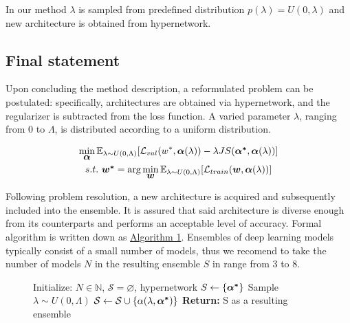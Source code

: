 \documentclass{article}
\begin{document}
In our method $\lambda$ is sampled from predefined distribution $p(\lambda) = U(0, \lambda)$ and new architecture is obtained from hypernetwork.

\subsection{Final statement}

Upon concluding the method description, a reformulated problem can be postulated: specifically, architectures are obtained via hypernetwork, and the regularizer is subtracted from the loss function. A varied parameter $\lambda$, ranging from 0 to $\Lambda$, is distributed according to a uniform distribution.

\begin{gather*}
        \min_{\mbox{\boldmath{$\alpha$}}} \mathbb{E}_{\lambda \sim U(0, \Lambda)} [\mathcal{L}_{val}(w^*, \mbox{\boldmath{$\alpha$}}(\lambda)) - \lambda JS(\mbox{\boldmath{$\alpha^*$}}, \mbox{\boldmath{$\alpha$}}(\lambda))] \\
    s.t. \text{ } \mbox{\boldmath{$w^*$}} = \arg \min_{\mbox{\boldmath{$w$}}} \mathbb{E}_{\lambda \sim U(0, \Lambda)}[\mathcal{L}_{train}(\mbox{\boldmath{$w$}}, \mbox{\boldmath{$\alpha$}}(\lambda))]
\end{gather*}

Following problem resolution, a new architecture is acquired and subsequently included into the ensemble. It is assured that said architecture is diverse enough from its counterparts and performs an acceptable level of accuracy. Formal algorithm is written down as \hyperref[alg:1]{Algorithm 1}. Ensembles of deep learning models typically consist of a small number of models, thus we recomend to take the number of models $N$ in the resulting ensemble $S$ in range from 3 to 8.
\begin{figure}[h]  
  \begin{minipage}{.6\linewidth}
    \begin{algorithm}[H]
    \caption{}\label{alg:1}
        \begin{algorithmic}
                \State Initialize: $N \in \mathbb{N}$, $\mathcal{S} = \varnothing$, hypernetwork
            \State $S \gets \{ \mbox{\boldmath{$\alpha^*$}} \}$ 
                \State Sample $\lambda \sim U(0, \Lambda)$
                \State $\mathcal{S} \gets \mathcal{S} \cup \{ \alpha(\lambda, \mbox{\boldmath{$\alpha^*$}}) \}$ 
            \EndFor
            \State \textbf{Return:} S as a resulting ensemble
        \end{algorithmic}
    \end{algorithm}
  \end{minipage}
\end{figure}
\end{document}
